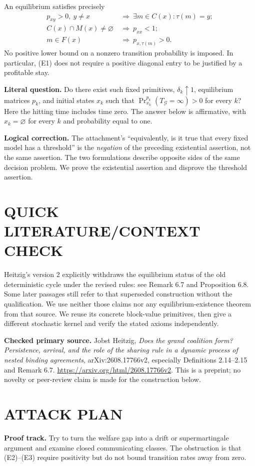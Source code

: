 \documentclass[11pt,a4paper]{article}
\theoremstyle{definition}\newtheorem{definition}[theorem]{Definition}
\theoremstyle{remark}\newtheorem{remark}[theorem]{Remark}
\newcommand{\1}{\mathbf 1}
\begin{document}
An equilibrium satisfies precisely
\begin{align*}
 p_{xy}>0,
 \ y\ne x&\ \Longrightarrow\ \exists m\in C(x):\tau(m)=y;\tag{E1}\\
 C(x)\cap M(x)\ne\varnothing&\ \Longrightarrow\ p_{xx}<1;\tag{E2}\\
 m\in F(x)&\ \Longrightarrow\ p_{x,\tau(m)}>0.\tag{E3}
\end{align*}
No positive lower bound on a nonzero transition probability is imposed. In particular, (E1) does not require a positive diagonal entry to be justified by a profitable stay.

\textbf{Literal question.} Do there exist such fixed primitives, $\delta_k\uparrow1$, equilibrium matrices $p_k$, and initial states $x_k$ such that
$\Pr_{x_k}^{p_k}(T_{\mathcal G}=\infty)>0$ for every $k$? Here the hitting time includes time zero. The answer below is affirmative, with $x_k=\varnothing$ for every $k$ and probability equal to one.

\textbf{Logical correction.} The attachment's ``equivalently, is it true that every fixed model has a threshold'' is the \emph{negation} of the preceding existential assertion, not the same assertion. The two formulations describe opposite sides of the same decision problem. We prove the existential assertion and disprove the threshold assertion.

\section{QUICK LITERATURE/CONTEXT CHECK}
Heitzig's version 2 explicitly withdraws the equilibrium status of the old deterministic cycle under the revised rules: see Remark 6.7 and Proposition 6.8. Some later passages still refer to that superseded construction without the qualification. We use neither those claims nor any equilibrium-existence theorem from that source. We reuse its concrete block-value primitives, then give a different stochastic kernel and verify the stated axioms independently.

\textbf{Checked primary source.} Jobst Heitzig, \emph{Does the grand coalition form? Persistence, arrival, and the role of the sharing rule in a dynamic process of nested binding agreements}, arXiv:2608.17766v2, especially Definitions 2.14--2.15 and Remark 6.7. \url{https://arxiv.org/html/2608.17766v2}. This is a preprint; no novelty or peer-review claim is made for the construction below.

\section{ATTACK PLAN}
\textbf{Proof track.} Try to turn the welfare gap into a drift or supermartingale argument and examine closed communicating classes. The obstruction is that (E2)--(E3) require positivity but do not bound transition rates away from zero.
\end{document}
